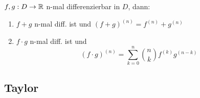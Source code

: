 \begin{satz}{4.34}
    $f,g: D \to \mathbb{R}$ n-mal differenzierbar in $D$, dann:
    \begin{enumerate}
        \item $f + g$ n-mal diff. ist und $(f + g)^{(n)} = f^{(n)} + g^{(n)}$
        \item $f \cdot g$ n-mal diff. ist und
              \[ (f \cdot g)^{(n)} = \sum_{k=0}^n \binom{n}{k} f^{(k)}g^{(n - k)} \]
    \end{enumerate}
\end{satz}

\subsection{Taylor}

